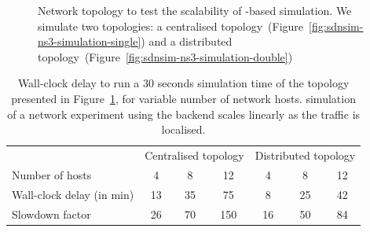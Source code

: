 \begin{figure}[ht]
\caption{Network topology to test the scalability of -based simulation. We
simulate two topologies: a centralised
topology~(Figure~\ref{fig:sdnsim-ns3-simulation-single}) and a distributed
topology~(Figure~\ref{fig:sdnsim-ns3-simulation-double})}
\label{fig:sdnsim-ns3-simulation}
\end{figure}

\begin{table}
\begin{center}
\begin{tabular}{|l|c|c|c|c|c|c|} \hline
&\multicolumn{3}{|c|}{Centralised topology} & \multicolumn{3}{|c|}{Distributed
  topology} \\
\cline{2-7}
Number of hosts & 4 & 8 & 12 & 4 & 8 & 12 \\
\hline 
Wall-clock delay (in min) & 13 & 35 & 75 & 8 & 25 & 42 \\
\hline
Slowdown factor & 26 & 70 & 150 & 16 & 50 & 84 \\
\hline 
\end{tabular}
\end{center}
\caption{Wall-clock delay to run a 30 seconds simulation time of the topology
  presented in Figure~\ref{fig:sdnsim-ns3-simulation}, for variable number of network hosts. 
  \sdnsim simulation of a network experiment using the  backend
  scales linearly as the traffic is localised. }
\label{tbl:sdnsim-ns3-simulation-results}
\end{table}

